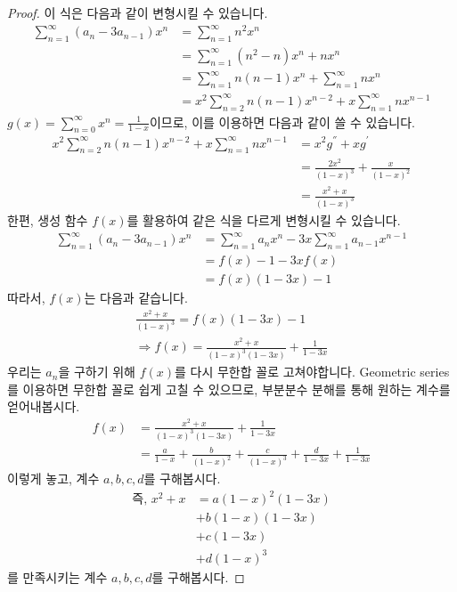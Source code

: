 \documentclass[a4paper, 12pt]{article}
\begin{document}
\begin{proof}
이 식은 다음과 같이 변형시킬 수 있습니다.
\begin{align*}
    \sum_{n=1}^{\infty} (a_n - 3a_{n-1} ) x^n & = \sum_{n=1}^{\infty} n^2 x^n \\
    & = \sum_{n=1}^{\infty} (n^2 - n)x^n + nx^n \\
    & = \sum_{n=1}^{\infty} n(n-1)x^n + \sum_{n=1}^{\infty} nx^n \\
    & = x^2 \sum_{n=2}^{\infty} n(n-1)x^{n-2} + x \sum_{n=1}^{\infty} nx^{n-1}
\end{align*}
$\displaystyle g(x) = \sum_{n=0}^{\infty}x^n = \frac{1}{1-x}$이므로, 이를 이용하면 다음과 같이 쓸 수 있습니다.
\begin{align*}
    x^2 \sum_{n=2}^{\infty} n(n-1)x^{n-2} + x \sum_{n=1}^{\infty} nx^{n-1} & = x^2 g^{''} + xg^{'} \\
    & = \frac{2x^2}{(1-x)^3} + \frac{x}{(1-x)^2} \\
    & = \frac{x^2 + x}{(1-x)^3}
\end{align*}
한편, 생성 함수 $f(x)$를 활용하여 같은 식을 다르게 변형시킬 수 있습니다.
\begin{align*}
    \sum_{n=1}^{\infty} (a_n - 3a_{n-1} ) x^n & = \sum_{n=1}^{\infty} a_n x^n -3x\sum_{n=1}^{\infty} a_{n-1} x^{n-1} \\
    & = f(x) - 1 - 3xf(x) \\
    & = f(x)(1-3x) - 1
\end{align*}
따라서, $f(x)$는 다음과 같습니다.
\begin{align*}
    \frac{x^2 + x}{(1-x)^3} = f(x)(1-3x) - 1 \\
    \Rightarrow f(x) = \frac{x^2 + x}{(1-x)^3(1-3x)} + \frac{1}{1-3x}
\end{align*}
우리는 $a_n$을 구하기 위해 $f(x)$를 다시 무한합 꼴로 고쳐야합니다. Geometric series를 이용하면 무한합 꼴로 쉽게 고칠 수 있으므로, 부분분수 분해를 통해 원하는 계수를 얻어내봅시다.
\begin{align*}
    f(x) & = \frac{x^2 + x}{(1-x)^3(1-3x)} + \frac{1}{1-3x} \\
    & = \frac{a}{1-x} + \frac{b}{(1-x)^2} + \frac{c}{(1-x)^3} + \frac{d}{1-3x} + \frac{1}{1-3x}
\end{align*}
이렇게 놓고, 계수 $a, b, c, d$를 구해봅시다.
\begin{align*}
    \textrm{즉, }x^2 + x & = a(1-x)^2 (1-3x) \\
    & + b(1-x)(1-3x) \\
    & + c(1-3x) \\
    & + d(1-x)^3
\end{align*}
를 만족시키는 계수 $a, b, c, d$를 구해봅시다.


\end{proof}
\end{document}

